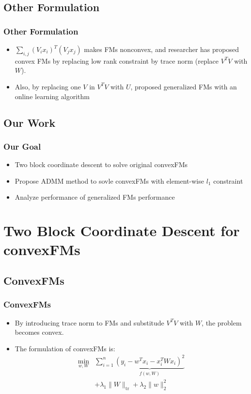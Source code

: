 \documentclass{beamer}
\begin{document}
  \subsection{Other Formulation}
  \begin{frame}
  \frametitle{Other Formulation}
    \begin{itemize}
      \item $\sum_{i, j} (V_ix_i)^T(V_jx_j)$ makes FMs nonconvex, and researcher has proposed convex FMs \cite{blondel2015convex} by replacing low rank constraint by trace norm (replace $V^TV$ with $W$).
      \item Also, by replacing one $V$ in $V^T V$ with $U$, \cite{lin2016non} proposed generalized FMs with an online learning algorithm
    \end{itemize}
  \end{frame}

  \subsection{Our Work}
  \begin{frame}
  \frametitle{Our Goal}
    \begin{itemize}
    \item Two block coordinate descent to solve original convexFMs
      \item Propose ADMM method to sovle convexFMs with element-wise $l_1$ constraint
      \item Analyze performance of generalized FMs performance 
    \end{itemize}
  \end{frame}

\section{Two Block Coordinate Descent for convexFMs} %
\subsection{ConvexFMs}
\begin{frame}
\frametitle{ConvexFMs}
\begin{itemize}
  \item By introducing trace norm to FMs and substitude $V^TV$ with $W$, the problem becomes convex.
  \item The formulation of convexFMs is:
    \begin{align*}
      \min_{w, W} & \sum_{i = 1}^n \underbrace{(y_i - w^Tx_i - x_i^T W x_i)^2}_{f(w, W)} \\
      & + \lambda_1 \|W\|_{\text{tr}} + \lambda_2 \|w\|_2^2
    \end{align*}
\end{itemize}
\end{frame}
\end{document}
